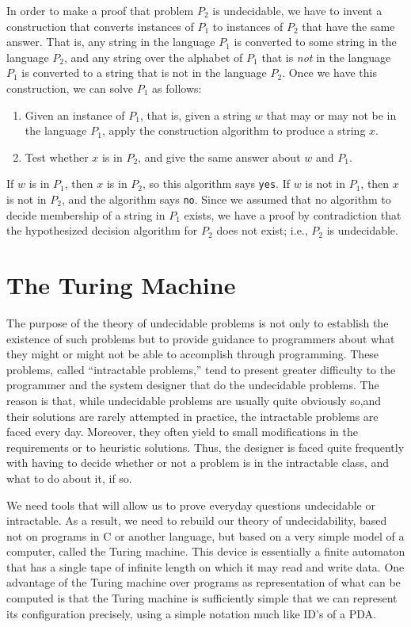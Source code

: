 \documentclass[]{article}
\begin{document}
In order to make a proof that problem $P_2$ is undecidable, we have to
invent a construction that converts instances of $P_1$ to instances of 
$P_2$ that have the same answer. That is, any string in the language $P_1$ 
is converted to some string in the language $P_2$, and any string over the
alphabet of $P_1$ that is \emph{not} in the language $P_1$ is converted to 
a string that is not in the language $P_2$. Once we have this construction, 
we can solve $P_1$ as follows:
\begin{enumerate}
\item Given an instance of $P_1$, that is, given a string $w$ that may 
or may not be in the language $P_1$, apply the construction algorithm 
to produce a string $x$.
\item Test whether $x$ is in $P_2$, and give the same answer about $w$
and $P_1$.
\end{enumerate}

If $w$ is in $P_1$, then $x$ is in $P_2$, so this algorithm says 
\texttt{yes}. If $w$ is not in $P_1$, then $x$ is not in $P_2$, and the 
algorithm says \texttt{no}. Since we assumed that no algorithm to decide
membership of a string in $P_1$ exists, we have a proof by contradiction 
that the hypothesized decision algorithm for $P_2$ does not exist; i.e., 
$P_2$ is undecidable.

\section*{The Turing Machine}
The purpose of the theory of undecidable problems is not only to establish 
the existence of such problems but to provide guidance to programmers about 
what they might or might not be able to accomplish through programming. These 
problems, called ``intractable problems,'' tend to present greater difficulty 
to the programmer and the system designer that do the undecidable problems. 
The reason is that, while undecidable problems are usually quite obviously 
so,and their solutions are rarely attempted in practice, the intractable 
problems are faced every day. Moreover, they often yield to small 
modifications in the requirements or to heuristic solutions. Thus, the 
designer is faced quite frequently with having to decide whether or not a 
problem is in the intractable class, and what to do about it, if so.

We need tools that will allow us to prove everyday questions undecidable or
intractable. As a result, we need to rebuild our theory of undecidability,
based not on programs in C or another language, but based on a very simple 
model of a computer, called the Turing machine. This device is essentially a 
finite automaton that has a single tape of infinite length on which it may 
read and write data. One advantage of the Turing machine over programs as 
representation of what can be computed is that the Turing machine is 
sufficiently simple that we can represent its configuration precisely, using 
a simple notation much like ID's of a PDA.
\end{document}
